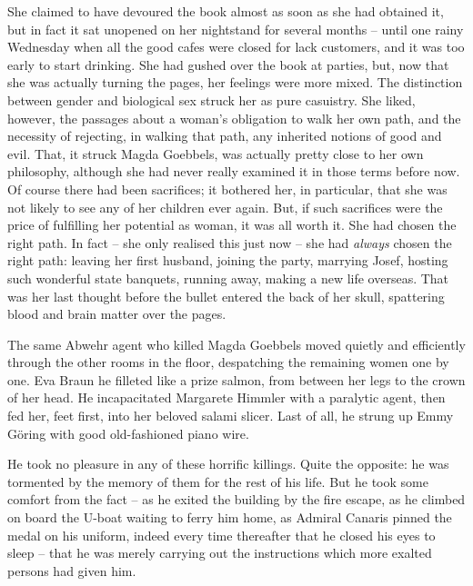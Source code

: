 She claimed to have devoured the book almost as soon as she had obtained it, but in fact it sat unopened on her nightstand for several months -- until one rainy Wednesday when all the good cafes were closed for lack customers, and it was too early to start drinking. She had gushed over the book at parties, but, now that she was actually turning the pages, her feelings were more mixed. The distinction between gender and biological sex struck her as pure casuistry. She liked, however, the passages about a woman's obligation to walk her own path, and the necessity of rejecting, in walking that path, any inherited notions of good and evil. That, it struck Magda Goebbels, was actually pretty close to her own philosophy, although she had never really examined it in those terms before now. Of course there had been sacrifices; it bothered her, in particular, that she was not likely to see any of her children ever again. But, if such sacrifices were the price of fulfilling her potential as woman, it was all worth it. She had chosen the right path. In fact -- she only realised this just now -- she had \emph{always} chosen the right path: leaving her first husband, joining the party, marrying Josef, hosting such wonderful state banquets, running away, making a new life overseas. That was her last thought before the bullet entered the back of her skull, spattering blood and brain matter over the pages.

The same Abwehr agent who killed Magda Goebbels moved quietly and efficiently through the other rooms in the floor, despatching the remaining women one by one. Eva Braun he filleted like a prize salmon, from between her legs to the crown of her head. He incapacitated Margarete Himmler with a paralytic agent, then fed her, feet first, into her beloved salami slicer. Last of all, he strung up Emmy G\"oring with good old-fashioned piano wire.

He took no pleasure in any of these horrific killings. Quite the opposite: he was tormented by the memory of them for the rest of his life. But he took some comfort from the fact -- as he exited the building by the fire escape, as he climbed on board the U-boat waiting to ferry him home, as Admiral Canaris pinned the medal on his uniform, indeed every time thereafter that he closed his eyes to sleep -- that he was merely carrying out the instructions which more exalted persons had given him.
